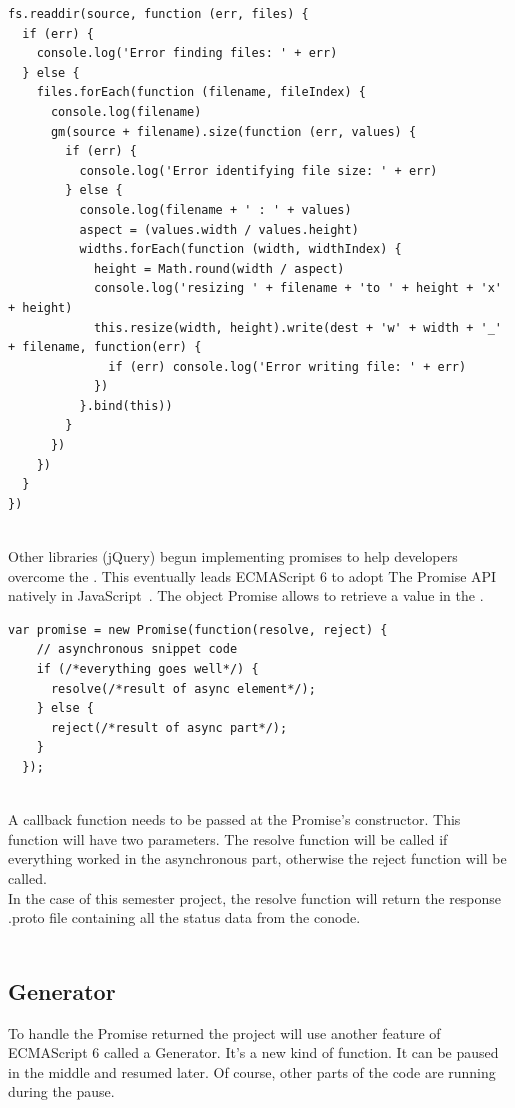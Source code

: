 \documentclass[11pt, a4paper, twoside, openright, openany]{book} %
\begin{document}
\begin{lstlisting}[caption={Example of Callback Hell with its typical pyramid shape}, captionpos=b]
  fs.readdir(source, function (err, files) {
  if (err) {
    console.log('Error finding files: ' + err)
  } else {
    files.forEach(function (filename, fileIndex) {
      console.log(filename)
      gm(source + filename).size(function (err, values) {
        if (err) {
          console.log('Error identifying file size: ' + err)
        } else {
          console.log(filename + ' : ' + values)
          aspect = (values.width / values.height)
          widths.forEach(function (width, widthIndex) {
            height = Math.round(width / aspect)
            console.log('resizing ' + filename + 'to ' + height + 'x' + height)
            this.resize(width, height).write(dest + 'w' + width + '_' + filename, function(err) {
              if (err) console.log('Error writing file: ' + err)
            })
          }.bind(this))
        }
      })
    })
  }
})
\end{lstlisting}
\leavevmode \\
Other libraries (jQuery) begun implementing promises to help developers overcome the .
This eventually leads ECMAScript 6 to adopt The Promise API~\cite{promise} natively in JavaScript~\cite{ecmaPromise}.
The object Promise allows to retrieve a value in the .
\\
\begin{lstlisting}[caption={Structure of a Promise}, captionpos=b]
  var promise = new Promise(function(resolve, reject) {
    // asynchronous snippet code
    if (/*everything goes well*/) {
      resolve(/*result of async element*/);
    } else {
      reject(/*result of async part*/);
    }
  });
\end{lstlisting}
\leavevmode \\
A callback function needs to be passed at the Promise's constructor. This function
will have two parameters. The resolve function will be called if everything worked in
the asynchronous part, otherwise the reject function will be called.\\
In the case of this semester project, the resolve function will return the response
.proto file containing all the status data from the conode.\\

\leavevmode \\

\subsection{Generator}
To handle the Promise returned the project will use another feature of ECMAScript 6 called a Generator.
It's a new kind of function. It can be paused in the middle and resumed later. Of course,
other parts of the code are running during the pause.\\
\end{document}
